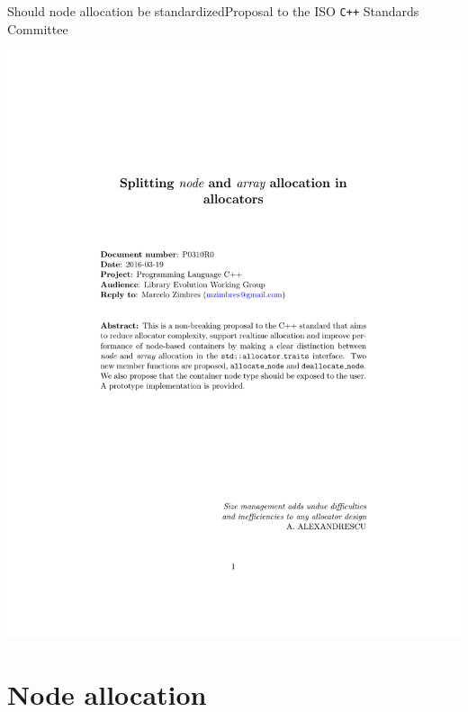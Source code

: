 \documentclass[10pt,aspectratio=169]{beamer}
\begin{document}
\begin{frame}{Should node allocation be standardized}{Proposal to the ISO \texttt{C++} Standards Committee}
\vspace{-3cm}
    \begin{center}
        \includegraphics[scale=0.6]{fig/prop1.pdf} \\
    \end{center}
\end{frame}

\section{Node allocation}
\end{document}
